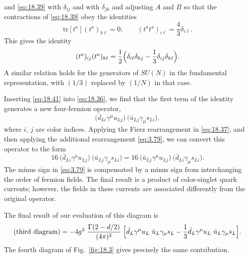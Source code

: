 and \eqref{eq:18.39} with $\delta_{ij}$ and with $\delta_{jk}$ and adjusting
$A$ and $B$ so that the contractions of \eqref{eq:18.39} obey the identities
\begin{equation}
  \mathrm{tr}[t^a](t^a)_{k\ell} = 0;\qquad
  (t^at^a)_{i\ell} = \frac{4}{3}\delta_{i\ell} .
  \label{eq:18.40}
\end{equation}
This gives the identity
\begin{equation}
  (t^a)_{ij}(t^a)_{k\ell} = \frac{1}{2}\Bigl( \delta_{i\ell}\delta_{kj}
    - \frac{1}{3}\delta_{ij}\delta_{k\ell} \Bigr) .
  \label{eq:18.41}
\end{equation}
A similar relation holds for the generators of $SU(N)$ in the fundamental
representation, with $(1/3)$ replaced by $(1/N)$ in that case.

Inserting \eqref{eq:18.41} into \eqref{eq:18.36}, we find that the first
term of the identity generates a new four-fermion operator,
\begin{equation}
  \bigl( \bar{d}_{Li}\gamma^\mu u_{Lj} \bigr)\ \bigl( \bar{u}_{Lj}
    \gamma_\mu s_{Li} \bigr) ,
  \label{eq:18.42}
\end{equation}
where $i$, $j$ are color indices.  Applying the Fierz rearrangement in
\eqref{eq:18.37}, and then applying the additional rearrangement
\eqref{eq:3.79}, we can convert this operator to the form
\begin{equation}
  16\ \bigl( \bar{d}_{Li}\gamma^\mu u_{Lj} \bigr)\ \bigl( \bar{u}_{Lj}
    \gamma_\mu s_{Li} \bigr) = 16\ \bigl( \bar{u}_{Lj}\gamma^\mu u_{Lj}
    \bigr)\ \bigl( \bar{d}_{Li}\gamma_\mu s_{Li} \bigr) .
  \label{eq:18.43}
\end{equation}
The minus sign in \eqref{eq:3.79} is compensated by a minus sign from
interchanging the order of fermion fields.  The final result is a product of
color-singlet quark currents; however, the fields in these currents are
associated differently from the original operator.

The final result of our evaluation of this diagram is
\begin{equation}
  \text{(third diagram)} = -4g^2\ \frac{\Gamma(2-d/2)}{(4\pi)^2}\ \Bigl[
    \bar{d}_L\gamma^\mu u_L\ \bar{u}_L\gamma_\mu s_L
    - \frac{1}{3}\bar{d}_L\gamma^\mu u_L\ \bar{u}_L\gamma_\mu s_L
    \Bigr] .
  \label{eq:18.44}
\end{equation}
The fourth diagram of Fig.~\ref{fig:18.3} gives precisely the same
contribution.

